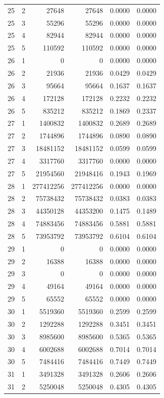 \begin{longtable}{rrrrrr}
25 & 2 & 27648 & 27648 & 0.0000 & 0.0000 \\
25 & 3 & 55296 & 55296 & 0.0000 & 0.0000 \\
25 & 4 & 82944 & 82944 & 0.0000 & 0.0000 \\
25 & 5 & 110592 & 110592 & 0.0000 & 0.0000 \\
26 & 1 & 0 & 0 & 0.0000 & 0.0000 \\
26 & 2 & 21936 & 21936 & 0.0429 & 0.0429 \\
26 & 3 & 95664 & 95664 & 0.1637 & 0.1637 \\
26 & 4 & 172128 & 172128 & 0.2232 & 0.2232 \\
26 & 5 & 835212 & 835212 & 0.1869 & 0.2337 \\
27 & 1 & 1400832 & 1400832 & 0.2689 & 0.2689 \\
27 & 2 & 1744896 & 1744896 & 0.0890 & 0.0890 \\
27 & 3 & 18481152 & 18481152 & 0.0599 & 0.0599 \\
27 & 4 & 3317760 & 3317760 & 0.0000 & 0.0000 \\
27 & 5 & 21954560 & 21948416 & 0.1943 & 0.1969 \\
28 & 1 & 277412256 & 277412256 & 0.0000 & 0.0000 \\
28 & 2 & 75738432 & 75738432 & 0.0383 & 0.0383 \\
28 & 3 & 44350128 & 44353200 & 0.1475 & 0.1489 \\
28 & 4 & 74883456 & 74883456 & 0.5881 & 0.5881 \\
28 & 5 & 73953792 & 73953792 & 0.6104 & 0.6104 \\
29 & 1 & 0 & 0 & 0.0000 & 0.0000 \\
29 & 2 & 16388 & 16388 & 0.0000 & 0.0000 \\
29 & 3 & 0 & 0 & 0.0000 & 0.0000 \\
29 & 4 & 49164 & 49164 & 0.0000 & 0.0000 \\
29 & 5 & 65552 & 65552 & 0.0000 & 0.0000 \\
30 & 1 & 5519360 & 5519360 & 0.2599 & 0.2599 \\
30 & 2 & 1292288 & 1292288 & 0.3451 & 0.3451 \\
30 & 3 & 8985600 & 8985600 & 0.5365 & 0.5365 \\
30 & 4 & 6002688 & 6002688 & 0.7014 & 0.7014 \\
30 & 5 & 7484416 & 7484416 & 0.7449 & 0.7449 \\
31 & 1 & 3491328 & 3491328 & 0.2606 & 0.2606 \\
31 & 2 & 5250048 & 5250048 & 0.4305 & 0.4305 \\

\end{longtable}
